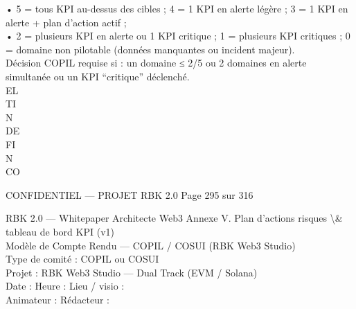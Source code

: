 \documentclass[12pt,landscape,a4paper]{article}
\newenvironment{confidential}
{\begin{tcolorbox}[
    colback=rbkred!5!white,
    colframe=rbkred!75!black,
    title=CONFIDENTIEL,
    fonttitle=\bfseries\color{white},
    coltitle=rbkred!75!black,
    breakable,
    enhanced,
    frame hidden,
    borderline west={2pt}{0pt}{rbkred!75!black}
]}
{\end{tcolorbox}}
\begin{document}
• 5 = tous KPI au-dessus des cibles ; 4 = 1 KPI en alerte légère ; 3 = 1 KPI en alerte + plan d’action actif ;\\
\vspace{0.5em}
• 2 = plusieurs KPI en alerte ou 1 KPI critique ; 1 = plusieurs KPI critiques ; 0 = domaine non pilotable (données manquantes ou incident majeur).\\
\vspace{0.5em}
Décision COPIL requise si : un domaine ≤ 2/5 ou 2 domaines en alerte simultanée ou un KPI “critique” déclenché.\\
\vspace{0.5em}
\vspace{0.5em}
\vspace{0.5em}
\vspace{0.5em}
EL\\
TI\\
N\\
DE\\
FI\\
N\\
CO\\
\vspace{0.5em}
\vspace{0.5em}
\vspace{0.5em}
\vspace{0.5em}
\begin{confidential}CONFIDENTIEL — PROJET RBK 2.0                                                               Page 295 sur 316\end{confidential}
RBK 2.0 — Whitepaper Architecte Web3                                                                              Annexe V. Plan d’actions risques \textbackslash{}& tableau de bord KPI (v1)\\
\vspace{0.5em}
\vspace{0.5em}
\vspace{0.5em}
Modèle de Compte Rendu — COPIL / COSUI (RBK Web3 Studio)\\
Type de comité : COPIL        ou      COSUI\\
\vspace{0.5em}
Projet : RBK Web3 Studio — Dual Track (EVM / Solana)\\
\vspace{0.5em}
Date :                                    Heure :                      Lieu / visio :\\
\vspace{0.5em}
Animateur :                                              Rédacteur :\\
\end{document}
